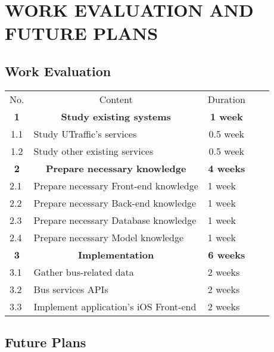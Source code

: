 \section{WORK EVALUATION AND FUTURE PLANS}

\subsection{Work Evaluation}

\begin{table}[H]
    \centering
    \begin{tabular}{|l|l|l|ll}
    \cline{1-3}
    \multicolumn{1}{|c|}{No.} & \multicolumn{1}{c|}{Content}          & \multicolumn{1}{c|}{Duration} &  &  \\ \cline{1-3}
    \multicolumn{1}{|c|}{\textbf{1}} & \multicolumn{1}{c|}{\textbf{Study existing systems}}      & \multicolumn{1}{c|}{\textbf{1 week}}  &           &           \\ \cline{1-3}
    \multicolumn{1}{|c|}{1.1} & Study UTraffic's services             & \multicolumn{1}{c|}{0.5 week} &  &  \\ \cline{1-3}
    \multicolumn{1}{|c|}{1.2} & Study other existing services         & \multicolumn{1}{c|}{0.5 week} &  &  \\ \cline{1-3}
    \multicolumn{1}{|c|}{\textbf{2}} & \multicolumn{1}{c|}{\textbf{Prepare necessary knowledge}} & \multicolumn{1}{c|}{\textbf{4 weeks}} & \textbf{} & \textbf{} \\ \cline{1-3}
    2.1                       & Prepare necessary Front-end knowledge & 1 week                        &  &  \\ \cline{1-3}
    2.2                       & Prepare necessary Back-end knowledge  & 1 week                        &  &  \\ \cline{1-3}
    2.3                       & Prepare necessary Database knowledge  & 1 week                        &  &  \\ \cline{1-3}
    2.4                       & Prepare necessary Model knowledge     & 1 week                        &  &  \\ \cline{1-3}
    \multicolumn{1}{|c|}{\textbf{3}} & \multicolumn{1}{c|}{\textbf{Implementation}}              & \multicolumn{1}{c|}{\textbf{6 weeks}} & \textbf{} & \textbf{} \\ \cline{1-3}
    3.1                       & Gather bus-related data               & 2 weeks                       &  &  \\ \cline{1-3}
    3.2                       & Bus services APIs                     & 2 weeks                       &  &  \\ \cline{1-3}
    3.3                       & Implement application's iOS Front-end & 2 weeks                       &  &  \\ \cline{1-3}
    \end{tabular}
    \end{table}

    
\subsection{Future Plans}
